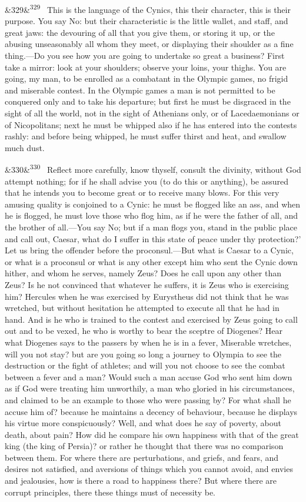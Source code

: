\documentclass[12pt]{article}
\newcommand{\para}[1][]{\par\noindent\ifx&#1&\else\textsuperscript{\footnotesize #1}~\fi}
\begin{document}
\para[329] This is the language of the Cynics, this their character, this is their purpose. You say No: but their characteristic is the little wallet, and staff, and great jaws: the devouring of all that you give them, or storing it up, or the abusing unseasonably all whom they meet, or displaying their shoulder as a fine thing.—Do you see how you are going to undertake so great a business? First take a mirror: look at your shoulders; observe your loins, your thighs. You are going, my man, to be enrolled as a combatant in the Olympic games, no frigid and miserable contest. In the Olympic games a man is not permitted to be conquered only and to take his departure; but first he must be disgraced in the sight of all the world, not in the sight of Athenians only, or of Lacedaemonians or of Nicopolitans; next he must be whipped also if he has entered into the contests rashly: and before being whipped, he must suffer thirst and heat, and swallow much dust.

\para[330] Reflect more carefully, know thyself, consult the divinity, without God attempt nothing; for if he shall advise you (to do this or anything), be assured that he intends you to become great or to receive many blows. For this very amusing quality is conjoined to a Cynic: he must be flogged like an ass, and when he is flogged, he must love those who flog him, as if he were the father of all, and the brother of all.—You say No; but if a man flogs you, stand in the public place and call out, Caesar, what do I suffer in this state of peace under thy protection?' Let us bring the offender before the proconsul.—But what is Caesar to a Cynic, or what is a proconsul or what is any other except him who sent the Cynic down hither, and whom he serves, namely Zeus? Does he call upon any other than Zeus? Is he not convinced that whatever he suffers, it is Zeus who is exercising him? Hercules when he was exercised by Eurystheus did not think that he was wretched, but without hesitation he attempted to execute all that he had in hand. And is he who is trained to the contest and exercised by Zeus going to call out and to be vexed, he who is worthy to bear the sceptre of Diogenes? Hear what Diogenes says to the passers by when he is in a fever, Miserable wretches, will you not stay? but are you going so long a journey to Olympia to see the destruction or the fight of athletes; and will you not choose to see the combat between a fever and a man? Would such a man accuse God who sent him down as if God were treating him unworthily, a man who gloried in his circumstances, and claimed to be an example to those who were passing by? For what shall he accuse him of? because he maintains a decency of behaviour, because he displays his virtue more conspicuously? Well, and what does he say of poverty, about death, about pain? How did he compare his own happiness with that of the great king (the king of Persia)? or rather he thought that there was no comparison between them. For where there are perturbations, and griefs, and fears, and desires not satisfied, and aversions of things which you cannot avoid, and envies and jealousies, how is there a road to happiness there? But where there are corrupt principles, there these things must of necessity be.
\end{document}
